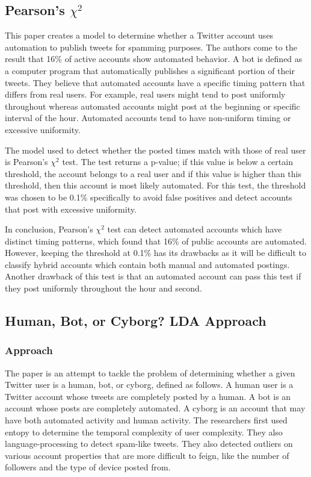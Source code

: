 \documentclass[11pt, oneside]{article}   	%
\begin{document}
\subsection*{Pearson's $\chi^2$}

\quad This paper \cite{pearson} creates a model to determine whether a Twitter account uses automation to publish tweets for spamming purposes. 
The authors come to the result that 16\% of active accounts show automated behavior.
A bot is defined as a computer program that automatically publishes a significant portion of their tweets.
They believe that automated accounts have a specific timing pattern that differs from real users.
For example, real users might tend to post uniformly throughout whereas automated accounts might post at the beginning or specific interval of the hour.
Automated accounts tend to have non-uniform timing or excessive uniformity.

\quad The model used to detect whether the posted times match with those of real user is Pearson's $\chi^2$ test.
The test returns a p-value; if this value is below a certain threshold, the account belongs to a real user and if this value is higher than this threshold, then this account is most likely automated.
For this test, the threshold was chosen to be 0.1\% specifically to avoid false positives and detect accounts that post with excessive uniformity.

\quad In conclusion, Pearson's $\chi^2$ test can detect automated accounts which have distinct timing patterns, which found that 16\% of public accounts are automated. However, keeping the threshold at 0.1\% has its drawbacks as it will be difficult to classify hybrid accounts which contain both manual and automated postings.
Another drawback of this test is that an automated account can pass this test if they post uniformly throughout the hour and second.

\subsection*{Human, Bot, or Cyborg? LDA Approach}

\subsubsection*{Approach}

\quad The paper \cite{cyborg} is an attempt to tackle the problem of determining whether a
given Twitter user is a human, bot, or cyborg, defined as follows.  A human user
is a Twitter account whose tweets are completely posted by a human.  A bot is an
account whose posts are completely automated.  A cyborg is an account that may
have both automated activity and human activity.  The researchers first used
entopy to determine the temporal complexity of user complexity. They also
language-processing to detect spam-like tweets. They also detected outliers on
various account properties that are more difficult to feign, like the
number of followers and the type of device posted from. 
\end{document}

